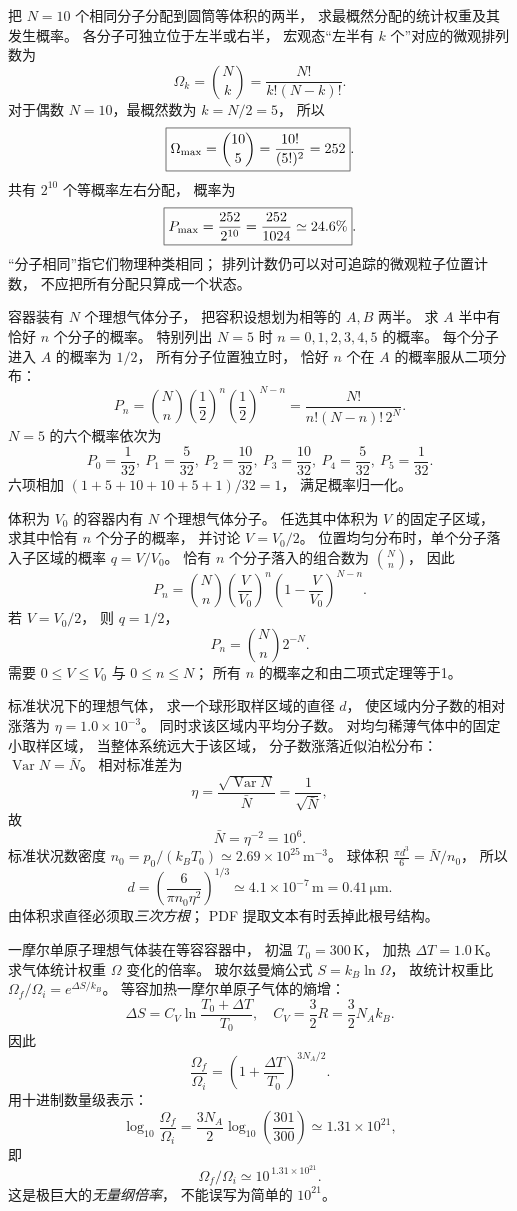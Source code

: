 把 $N=10$ 个相同分子分配到圆筒等体积的两半，
求最概然分配的统计权重及其发生概率。
\exsolution
各分子可独立位于左半或右半，
宏观态“左半有 $k$ 个”对应的微观排列数为
\[
\Omega_k=\binom Nk=\frac{N!}{k!(N-k)!}.
\]
对于偶数 $N=10$，最概然数为 $k=N/2=5$，
所以
\[
\boxed{\Omega_{\rm max}=\binom{10}{5}
=\frac{10!}{(5!)^2}=252}.
\]
共有 $2^{10}$ 个等概率左右分配，
概率为
\[
\boxed{P_{\rm max}=\frac{252}{2^{10}}
=\frac{252}{1024}\simeq24.6\%}.
\]
\excheck “分子相同”指它们物理种类相同；
排列计数仍可以对可追踪的微观粒子位置计数，
不应把所有分配只算成一个状态。

容器装有 $N$ 个理想气体分子，
把容积设想划为相等的 $A,B$ 两半。
求 $A$ 半中有恰好 $n$ 个分子的概率。
特别列出 $N=5$ 时
$n=0,1,2,3,4,5$ 的概率。
\exsolution
每个分子进入 $A$ 的概率为 $1/2$，
所有分子位置独立时，
恰好 $n$ 个在 $A$ 的概率服从二项分布：
\[
\boxed{P_n=\binom Nn
\left(\frac12\right)^n
\left(\frac12\right)^{N-n}
=\frac{N!}{n!(N-n)!\,2^N}}.
\]
$N=5$ 的六个概率依次为
\[
\boxed{
P_0=\frac1{32},\
P_1=\frac5{32},\
P_2=\frac{10}{32},\
P_3=\frac{10}{32},\
P_4=\frac5{32},\
P_5=\frac1{32}}.
\]
\excheck 六项相加
$(1+5+10+10+5+1)/32=1$，
满足概率归一化。

体积为 $V_0$ 的容器内有 $N$ 个理想气体分子。
任选其中体积为 $V$ 的固定子区域，
求其中恰有 $n$ 个分子的概率，
并讨论 $V=V_0/2$。
\exsolution
位置均匀分布时，单个分子落入子区域的概率
$q=V/V_0$。
恰有 $n$ 个分子落入的组合数为 $\binom Nn$，
因此
\[
\boxed{P_n=\binom Nn
\left(\frac V{V_0}\right)^n
\left(1-\frac V{V_0}\right)^{N-n}}.
\]
若 $V=V_0/2$，
则 $q=1/2$，
\[
\boxed{P_n=\binom Nn2^{-N}}.
\]
\excheck 需要 $0\le V\le V_0$ 与 $0\le n\le N$；
所有 $n$ 的概率之和由二项式定理等于1。

标准状况下的理想气体，
求一个球形取样区域的直径 $d$，
使区域内分子数的相对涨落为
$\eta=1.0\times10^{-3}$。
同时求该区域内平均分子数。
\exsolution
对均匀稀薄气体中的固定小取样区域，
当整体系统远大于该区域，
分子数涨落近似泊松分布：
$\operatorname{Var}N=\bar N$。
相对标准差为
\[
\eta=\frac{\sqrt{\operatorname{Var}N}}{\bar N}
=\frac1{\sqrt{\bar N}},
\]
故
\[
\boxed{\bar N=\eta^{-2}=10^6}.
\]
标准状况数密度
$n_0=p_0/(k_BT_0)
\simeq2.69\times10^{25}\,\mathrm{m^{-3}}$。
球体积
$\frac{\pi d^3}{6}=\bar N/n_0$，
所以
\[
\boxed{d=\left(\frac6{\pi n_0\eta^2}\right)^{1/3}
\simeq4.1\times10^{-7}\,\mathrm m
=0.41\,\mathrm{\mu m}}.
\]
\excheck 由体积求直径必须取\emph{三次方根}；
PDF 提取文本有时丢掉此根号结构。

一摩尔单原子理想气体装在等容容器中，
初温 $T_0=300\,\mathrm K$，
加热 $\Delta T=1.0\,\mathrm K$。
求气体统计权重 $\Omega$ 变化的倍率。
\exsolution
玻尔兹曼熵公式
$S=k_B\ln\Omega$，
故统计权重比
$\Omega_f/\Omega_i=e^{\Delta S/k_B}$。
等容加热一摩尔单原子气体的熵增：
\[
\Delta S=C_V\ln\frac{T_0+\Delta T}{T_0},
\quad C_V=\frac32R=\frac32N_Ak_B.
\]
因此
\[
\boxed{\frac{\Omega_f}{\Omega_i}
=\left(1+\frac{\Delta T}{T_0}\right)^{3N_A/2}}.
\]
用十进制数量级表示：
\[
\log_{10}\frac{\Omega_f}{\Omega_i}
=\frac{3N_A}{2}\log_{10}\left(\frac{301}{300}\right)
\simeq1.31\times10^{21},
\]
即
\[
\boxed{\Omega_f/\Omega_i
\simeq10^{\,1.31\times10^{21}}}.
\]
\excheck 这是极巨大的\emph{无量纲倍率}，
不能误写为简单的 $10^{21}$。
